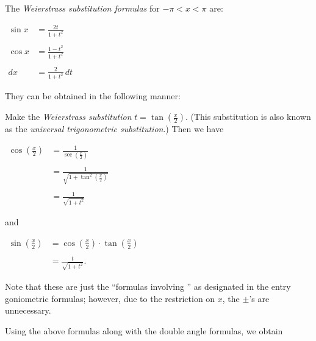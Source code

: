 \documentclass[12pt]{article}
\begin{document}

The \emph{Weierstrass substitution formulas} for $-\pi < x < \pi$ are:

\begin{center}
$\begin{array}{rl}
\sin x & =\displaystyle \frac{2t}{1+t^2} \\
& \\
\cos x & =\displaystyle \frac{1-t^2}{1+t^2}\\
& \\
dx & =\displaystyle \frac{2}{1+t^2} \, dt
\end{array}$
\end{center}

They can be obtained in the following manner:

Make the \emph{Weierstrass substitution} $\displaystyle t=\tan \left( \frac{x}{2} \right)$.  (This substitution is also known as the \emph{universal trigonometric substitution}.)  Then we have

\begin{center}
$\begin{array}{rl}
\displaystyle \cos \left( \frac{x}{2} \right) & = \displaystyle \frac{1}{\displaystyle \sec \left( \frac{x}{2} \right)} \\
& \\
& = \displaystyle \frac{1}{\displaystyle \sqrt{1+\tan^2\left( \frac{x}{2} \right)}} \\
& \\
& = \displaystyle \frac{1}{\sqrt{1+t^2}}
\end{array}$
\end{center}

and

\begin{center}
$\begin{array}{rl}
\displaystyle \sin \left( \frac{x}{2} \right) & = \displaystyle \cos \left( \frac{x}{2} \right) \cdot \tan \left( \frac{x}{2} \right) \\
& \\
& = \displaystyle \frac{t}{\sqrt{1+t^2}}.
\end{array}$
\end{center}

Note that these are just the ``formulas involving '' as designated in the entry goniometric formulas; however, due to the restriction on $x$, the $\pm$'s are unnecessary.

Using the above formulas along with the double angle formulas, we obtain
\end{document}
